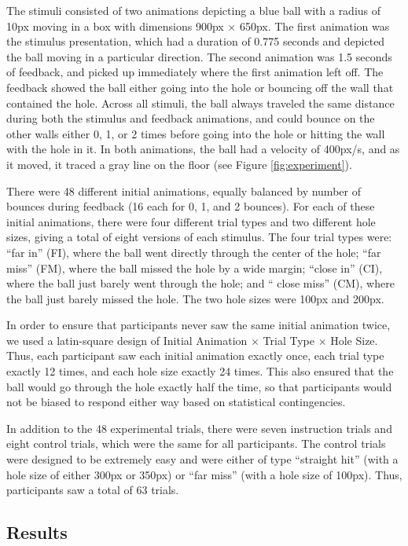 \documentclass[10pt,letterpaper]{article}
\begin{document}
The stimuli consisted of two animations depicting a blue ball with a radius of 10px moving in a box with dimensions 900px $\times$ 650px.
The first animation was the stimulus presentation, which had a duration of 0.775 seconds and depicted the ball moving in a particular direction.
The second animation was 1.5 seconds of feedback, and picked up immediately where the first animation left off.
The feedback showed the ball either going into the hole or bouncing off the wall that contained the hole.
Across all stimuli, the ball always traveled the same distance during both the stimulus and feedback animations, and could bounce on the other walls either 0, 1, or 2 times before going into the hole or hitting the wall with the hole in it.
In both animations, the ball had a velocity of 400px/s, and as it moved, it traced a gray line on the floor (see Figure \ref{fig:experiment}).

There were 48 different initial animations, equally balanced by number of bounces during feedback (16 each for 0, 1, and 2 bounces). 
For each of these initial animations, there were four different trial types and two different hole sizes, giving a total of eight versions of each stimulus. 
The four trial types were: ``far in'' (FI), where the ball went directly through the center of the hole; ``far miss'' (FM), where the ball missed the hole by a wide margin; ``close in'' (CI), where the ball just barely went through the hole; and `` close miss'' (CM), where the ball just barely missed the hole. 
The two hole sizes were 100px and 200px.

In order to ensure that participants never saw the same initial animation twice, we used a latin-square design of Initial Animation $\times$ Trial Type $\times$ Hole Size.
Thus, each participant saw each initial animation exactly once, each trial type exactly 12 times, and each hole size exactly 24 times.
This also ensured that the ball would go through the hole exactly half the time, so that participants would not be biased to respond either way based on statistical contingencies.

In addition to the 48 experimental trials, there were seven instruction trials and eight control trials, which were the same for all participants.
The control trials were designed to be extremely easy and were either of type ``straight hit'' (with a hole size of either 300px or 350px) or ``far miss'' (with a hole size of 100px).
Thus, participants saw a total of 63 trials.

\subsection{Results}
\end{document}
